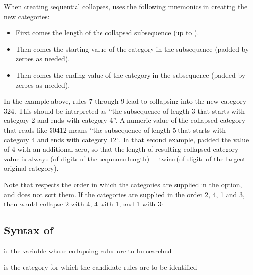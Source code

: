 When creating sequential collapses,  uses the following mnemonics
in creating the new categories:
\begin{itemize}
    \item First comes the length of the collapsed subsequence (up to ).
    \item Then comes the starting value of the category in the subsequence (padded by zeroes as needed).
    \item Then comes the ending value of the category in the subsequence (padded by zeroes as needed).
\end{itemize}

In the example above, rules 7 through 9 lead to collapsing into the new category 324. This
should be interpreted as ``the subsequence of length 3 that starts with category 2 and ends with category 4''.
A numeric value of the collapsed category that reads like 50412 means
``the subsequence of length 5 that starts with category 4 and ends with category 12''.
In that second example,  padded the value of 4 with an additional zero,
so that the length of resulting collapsed category value is always (\stnum of digits of the sequence length) +
twice (\stnum of digits of the largest original category).

Note that  respects the order in which the categories are
supplied in the  option, and does not sort them. If the categories are supplied
in the order 2, 4, 1 and 3, then  would collapse 2 with 4, 4 with 1,
and 1 with 3:

\begin{stlog}
\nullskip
\end{stlog}


\subsection{Syntax of }


\hangpara
{} is the variable whose collapsing rules are to be searched

\hangpara
{} is the category for which the candidate rules are to be identified

